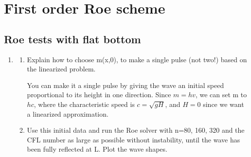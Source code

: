 

\section{First order Roe scheme} 
\subsection{Roe tests with flat bottom} %
\label{sub:roe_tests_with_flat_bottom}

\label{sec:first_order_roe_scheme} 
\begin{enumerate}
	\item 
	\begin{enumerate}
		\item Explain how to choose m(x,0), to make a single pulse (not two!) based on the linearized problem. 
		
		You can make it a single pulse by giving the wave an initial speed proportional to its height in one direction. Since $m=hv$, we can set m to $hc$, where the characteristic speed is $c=\sqrt{gH}$, and $H=0$ since we want a linearized approximation.
		
		\item Use this initial data and run the Roe solver with n=80, 160, 320 and the CFL number as large as possible without instability, until the wave has been fully reflected at L. Plot the wave shapes. 
		

\end{enumerate}
\end{enumerate}
